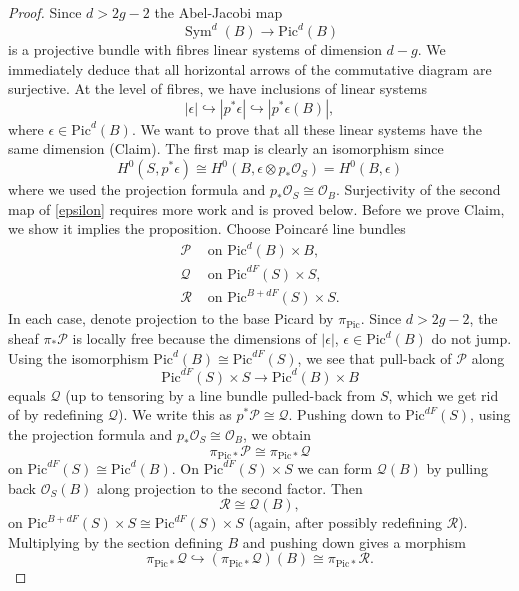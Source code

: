\documentclass{amsart}
\theoremstyle{definition}
\renewcommand{\O}{\mathcal{O}}
\newcommand{\Pic}{\mathrm{Pic}}
\newcommand{\Sym}{\operatorname{Sym}}
\newcommand{\cP}{\mathcal{P}}
\newcommand{\cQ}{\mathcal{Q}}
\newcommand{\cR}{\mathcal{R}}
\begin{document}
\begin{proof}
Since $d > 2g-2$ the Abel-Jacobi map 
$$
\Sym^d(B) \rightarrow \Pic^d(B)
$$
is a projective bundle with fibres linear systems of dimension $d-g$. We immediately deduce that all horizontal arrows of the commutative diagram are surjective. At the level of fibres, we have inclusions of linear systems
\begin{equation} \label{epsilon}
|\epsilon| \hookrightarrow |p^* \epsilon| \hookrightarrow |p^* \epsilon (B)|,
\end{equation}
where $\epsilon \in \Pic^d(B)$. We want to prove that all these linear systems have the same dimension (Claim). The first map is clearly an isomorphism since
$$
H^0(S,p^* \epsilon) \cong H^0(B, \epsilon \otimes p_* \O_S) = H^0(B,\epsilon)
$$
where we used the projection formula and $p_* \O_S \cong \O_B$. Surjectivity of the second map of \eqref{epsilon} requires more work and is proved below. Before we prove Claim, we show it implies the proposition. Choose Poincar\'e line bundles 
\begin{align*}
\cP &\textrm{ \ on \ } \Pic^d(B) \times B, \\
\cQ &\textrm{ \ on \ } \Pic^{dF}(S) \times S, \\
\cR &\textrm{ \ on \ } \Pic^{B+dF}(S) \times S.
\end{align*}
In each case, denote projection to the base Picard by $\pi_{\Pic}$. Since $d > 2g-2$, the sheaf $\pi_* \mathcal{P}$ is locally free because the dimensions of $|\epsilon|$, $\epsilon \in \Pic^d(B)$ do not jump. Using the isomorphism $\Pic^d(B) \cong \Pic^{dF}(S)$, we see that pull-back of $\mathcal{P}$ along 
$$
\Pic^{dF}(S) \times S \rightarrow \Pic^d(B) \times B
$$
equals $\mathcal{Q}$ (up to tensoring by a line bundle pulled-back from $S$, which we get rid of by redefining $\mathcal{Q}$). We write this as $p^* \mathcal{P} \cong \mathcal{Q}$. Pushing down to $\Pic^{dF}(S)$, using the projection formula and $p_* \O_S \cong \O_B$, we obtain
$$
\pi_{\Pic *} \cP \cong \pi_{\Pic *} \cQ
$$
on $\Pic^{dF}(S) \cong \Pic^{d}(B)$. On $\Pic^{dF}(S) \times S$ we can form $\cQ(B)$ by pulling back $\O_S(B)$ along projection to the second factor. Then
$$
\cR \cong \cQ(B),
$$
on $\Pic^{B+dF}(S) \times S \cong \Pic^{dF}(S) \times S$ (again, after possibly redefining $\cR$). Multiplying by the section defining $B$ and pushing down gives a morphism
\begin{equation} \label{vbmap}
\pi_{\Pic *} \cQ \hookrightarrow (\pi_{\Pic *} \cQ)(B) \cong \pi_{\Pic *} \cR.
\end{equation}

\end{proof}
\end{document}
